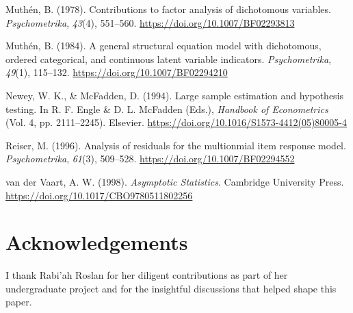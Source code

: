 \documentclass[
  letterpaper,
  DIV=11,
  numbers=noendperiod]{scrartcl}
\newlength{\cslhangindent}
\newenvironment{CSLReferences}[2] %
 {\begin{list}{}{%
  \setlength{\itemindent}{0pt}
  \setlength{\leftmargin}{0pt}
  \setlength{\parsep}{0pt}
  \ifodd #1
   \setlength{\leftmargin}{\cslhangindent}
   \setlength{\itemindent}{-1\cslhangindent}
  \fi
  \setlength{\itemsep}{#2\baselineskip}}}
 {\end{list}}
\begin{document}
\begin{CSLReferences}{1}{0}
Muthén, B. (1978). Contributions to factor analysis of dichotomous
variables. \emph{Psychometrika}, \emph{43}(4), 551--560.
\url{https://doi.org/10.1007/BF02293813}

Muthén, B. (1984). A general structural equation model with dichotomous,
ordered categorical, and continuous latent variable indicators.
\emph{Psychometrika}, \emph{49}(1), 115--132.
\url{https://doi.org/10.1007/BF02294210}

Newey, W. K., \& McFadden, D. (1994). Large sample estimation and
hypothesis testing. In R. F. Engle \& D. L. McFadden (Eds.),
\emph{Handbook of {Econometrics}} (Vol. 4, pp. 2111--2245). Elsevier.
\url{https://doi.org/10.1016/S1573-4412(05)80005-4}

Reiser, M. (1996). Analysis of residuals for the multionmial item
response model. \emph{Psychometrika}, \emph{61}(3), 509--528.
\url{https://doi.org/10.1007/BF02294552}

van der Vaart, A. W. (1998). \emph{Asymptotic {Statistics}}. Cambridge
University Press. \url{https://doi.org/10.1017/CBO9780511802256}

\end{CSLReferences}

\section*{Acknowledgements}\label{acknowledgements}

I thank Rabi'ah Roslan for her diligent contributions as part of her
undergraduate project and for the insightful discussions that helped
shape this paper.
\end{document}
